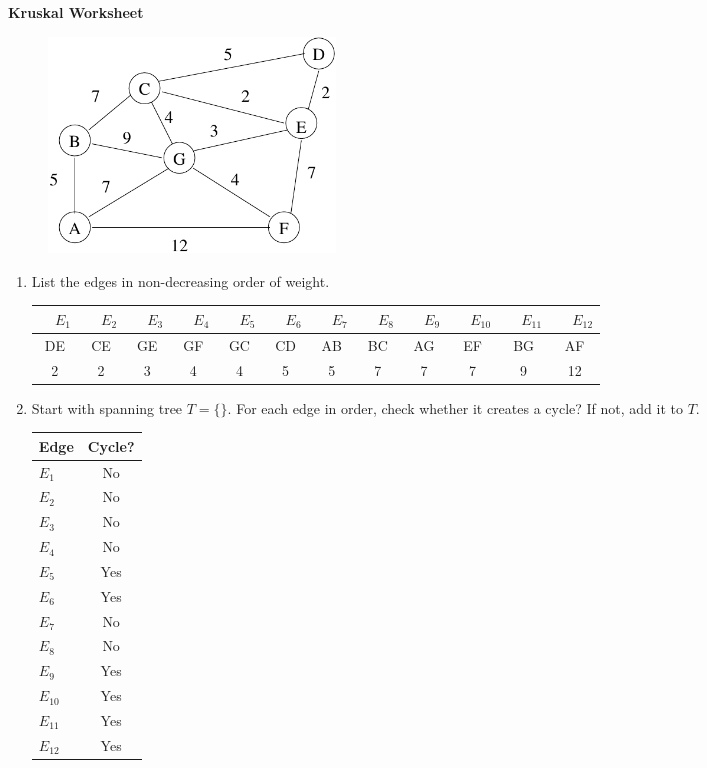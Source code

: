\documentclass[12pt]{article}
\begin{document}
\newcommand{\lsp}[1]{\large\renewcommand{\baselinestretch}{#1}\normalsize}

\lsp{1}
\pagestyle{plain}
\begin{center}
{\bf
Kruskal Worksheet
}
\end{center}

\begin{figure}[h]
\center
\includegraphics[width = 3in]{spanning.pdf}
\end{figure}

\begin{enumerate}
\item List the edges in non-decreasing order of weight.

\begin{tabular}{|c|c|c|c|c|c|c|c|c|c|c|c|} \hline
~~$E_1$ & ~~$E_2$ & ~~$E_3$ & ~~$E_4$ & ~~$E_5$ & ~~$E_6$ & ~~$E_7$ & ~~$E_8$ & ~~$E_9$ & ~~$E_{10}$ & ~~$E_{11}$ & ~~$E_{12}$ \\ \hline
 DE & CE & GE & GF & GC & CD & AB & BC & AG & EF & BG & AF \\ 
 2& 2& 3& 4& 4& 5& 5& 7& 7& 7& 9& 12\\ \hline 
\end{tabular}

\item Start with spanning tree $T = \{ \}$. For each edge in order, 
check whether it creates a cycle? If not, add it to $T$.

\begin{tabular}{|l|c|} \hline
Edge  & Cycle?\\ \hline
$E_1$ & No\\ \hline
$E_2$ & No\\ \hline
$E_3$ & No\\ \hline
$E_4$ & No\\ \hline
$E_5$ & Yes\\ \hline
$E_6$ & Yes\\ \hline
$E_7$ & No\\ \hline
$E_8$ & No\\ \hline
$E_9$ & Yes\\ \hline
$E_{10}$ & Yes\\ \hline
$E_{11}$ & Yes\\ \hline
$E_{12}$ & Yes\\ \hline
\end{tabular}

\end{enumerate}
\end{document}
